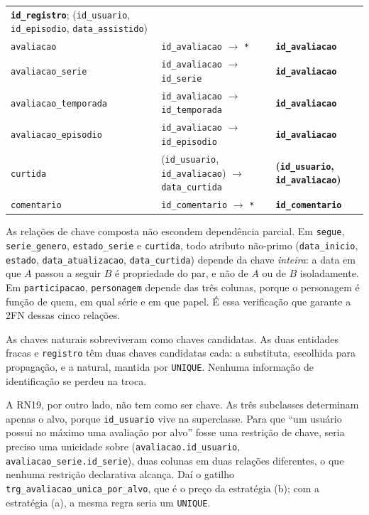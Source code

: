 \documentclass[a4paper,12pt,oneside,openany]{book}
\newcommand{\id}[1]{\texttt{#1}}
\begin{document}
\begin{longtable}{@{}p{3.6cm}p{6cm}p{6.2cm}@{}}
\textbf{\id{id\_registro}}; (\id{id\_usuario}, \id{id\_episodio},
\id{data\_assistido}) \\
\addlinespace
\id{avaliacao} &
\id{id\_avaliacao} $\rightarrow$ \id{*} &
\textbf{\id{id\_avaliacao}} \\
\addlinespace
\id{avaliacao\_serie} &
\id{id\_avaliacao} $\rightarrow$ \id{id\_serie} &
\textbf{\id{id\_avaliacao}} \\
\addlinespace
\id{avaliacao\_temporada} &
\id{id\_avaliacao} $\rightarrow$ \id{id\_temporada} &
\textbf{\id{id\_avaliacao}} \\
\addlinespace
\id{avaliacao\_episodio} &
\id{id\_avaliacao} $\rightarrow$ \id{id\_episodio} &
\textbf{\id{id\_avaliacao}} \\
\addlinespace
\id{curtida} &
(\id{id\_usuario}, \id{id\_avaliacao}) $\rightarrow$ \id{data\_curtida} &
\textbf{(\id{id\_usuario}, \id{id\_avaliacao})} \\
\addlinespace
\id{comentario} &
\id{id\_comentario} $\rightarrow$ \id{*} &
\textbf{\id{id\_comentario}} \\
\bottomrule
\end{longtable}

As relações de chave composta não escondem dependência parcial. Em \id{segue},
\id{serie\_genero}, \id{estado\_serie} e \id{curtida}, todo atributo não-primo
(\id{data\_inicio}, \id{estado}, \id{data\_atualizacao}, \id{data\_curtida}) depende
da chave \emph{inteira}: a data em que $A$ passou a seguir $B$ é propriedade do par,
e não de $A$ ou de $B$ isoladamente. Em \id{participacao}, \id{personagem} depende
das três colunas, porque o personagem é função de quem, em qual série e em que papel.
É essa verificação que garante a 2FN dessas cinco relações.

As chaves naturais sobreviveram como chaves candidatas. As duas entidades fracas e
\id{registro} têm duas chaves candidatas cada: a substituta, escolhida para
propagação, e a natural, mantida por \id{UNIQUE}. Nenhuma informação de identificação
se perdeu na troca.

A RN19, por outro lado, não tem como ser chave. As três subclasses determinam apenas o
alvo, porque \id{id\_usuario} vive na superclasse. Para que ``um usuário possui no
máximo uma avaliação por alvo'' fosse uma restrição de chave, seria preciso uma
unicidade sobre (\id{avaliacao.id\_usuario}, \id{avaliacao\_serie.id\_serie}), duas
colunas em duas relações diferentes, o que nenhuma restrição declarativa alcança. Daí
o gatilho \id{trg\_avaliacao\_unica\_por\_alvo}, que é o preço da estratégia (b);
com a estratégia (a), a mesma regra seria um \id{UNIQUE}.
\end{document}
